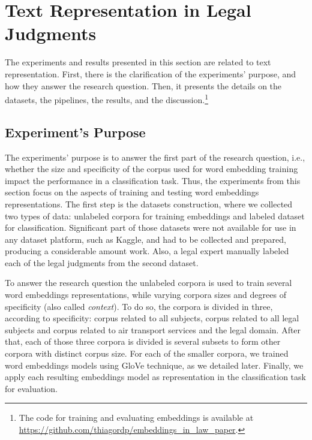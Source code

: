 \section{Text Representation in Legal Judgments}\label{sec:text_representation}


The experiments and results presented in this section are related to text representation. First, there is the clarification of the experiments' purpose, and how they answer the research question. Then, it presents the details on the datasets, the pipelines, the results, and the discussion.\footnote{The code for training and evaluating embeddings is available at \url{https://github.com/thiagordp/embeddings_in_law_paper}.}




\subsection{Experiment's Purpose}


The experiments' purpose is to answer the first part of the research question, i.e., whether the size and specificity of the corpus used for word embedding training impact the performance in a classification task. 
Thus, the experiments from this section focus on the aspects of training and testing word embeddings representations. The first step is the datasets construction, where we collected two types of data: unlabeled corpora for training embeddings and labeled dataset for classification. Significant part of those datasets were not available for use in any dataset platform, such as Kaggle, and had to be collected and prepared, producing a considerable amount work. Also, a legal expert manually labeled each of the legal judgments from the second dataset.


To answer the research question the unlabeled corpora is used to train several word embeddings representations, while varying corpora sizes and degrees of specificity (also called \textit{context}). To do so, the corpora is divided in three, according to specificity: corpus related to all subjects, corpus related to all legal subjects and corpus related to air transport services and the legal domain. 
After that, each of those three corpora is divided is several subsets to form other corpora with distinct  corpus size. 
For each of the smaller corpora, we trained word embeddings models using GloVe technique, as we detailed later. Finally, we apply each resulting  embeddings model as representation in the classification task for evaluation.


